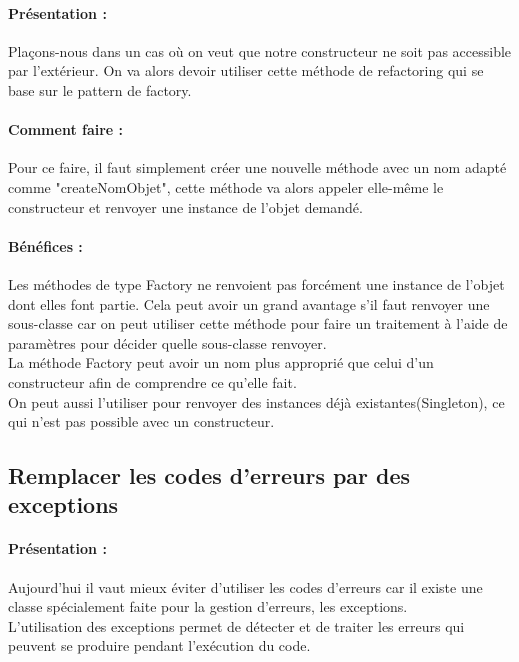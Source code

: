 \documentclass[a4paper,twoside,12pt,openright]{report}
\begin{document}
\paragraph{Présentation :}
Plaçons-nous dans un cas où on veut que notre constructeur ne soit pas accessible par l'extérieur.
On va alors devoir utiliser cette méthode de refactoring qui se base sur le pattern de factory.

\paragraph{Comment faire :}
Pour ce faire, il faut simplement créer une nouvelle méthode avec un nom adapté comme "createNomObjet", cette méthode va alors appeler elle-même le constructeur et renvoyer une instance de l'objet demandé.

\paragraph{Bénéfices :}
Les méthodes de type Factory ne renvoient pas forcément une instance de l'objet dont elles font partie. Cela peut avoir un grand avantage s'il faut renvoyer une sous-classe car on peut utiliser cette méthode pour faire un traitement à l'aide de paramètres pour décider quelle sous-classe renvoyer.\\
La méthode Factory peut avoir un nom plus approprié que celui d'un constructeur afin de comprendre ce qu'elle fait.\\
On peut aussi l'utiliser pour renvoyer des instances déjà existantes(Singleton), ce qui n'est pas possible avec un constructeur.\\

\newpage

\subsection{Remplacer les codes d'erreurs par des exceptions}
\paragraph{Présentation :}
Aujourd'hui il vaut mieux éviter d'utiliser les codes d'erreurs car il existe une classe spécialement faite pour la gestion d'erreurs, les exceptions.\\
L'utilisation des exceptions permet de détecter et de traiter les erreurs qui peuvent se produire pendant l'exécution du code.\\
\end{document}
